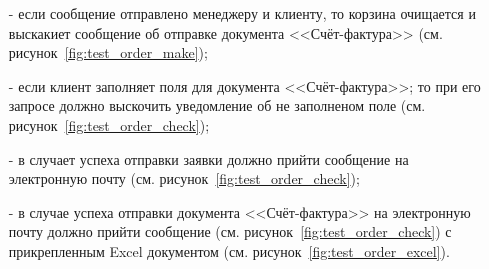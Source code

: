 \begin{itemize}
    \item[-] если сообщение отправлено менеджеру и клиенту,
    то корзина очищается и выскакиет сообщение об отправке документа <<Счёт-фактура>> (см. рисунок~\ref{fig:test_order_make});
    \item[-] если клиент заполняет поля для документа <<Счёт-фактура>>;
    то при его запросе должно выскочить уведомление об не заполненом поле (см. рисунок~\ref{fig:test_order_check});
    \item[-] в случает успеха отправки заявки должно прийти сообщение на электронную почту (см. рисунок~\ref{fig:test_order_check});
    \item[-] в случае успеха отправки документа <<Счёт-фактура>> на электронную почту должно прийти сообщение (см. рисунок~\ref{fig:test_order_check})
    с прикрепленным Excel документом (см. рисунок~\ref{fig:test_order_excel}).
\end{itemize}

